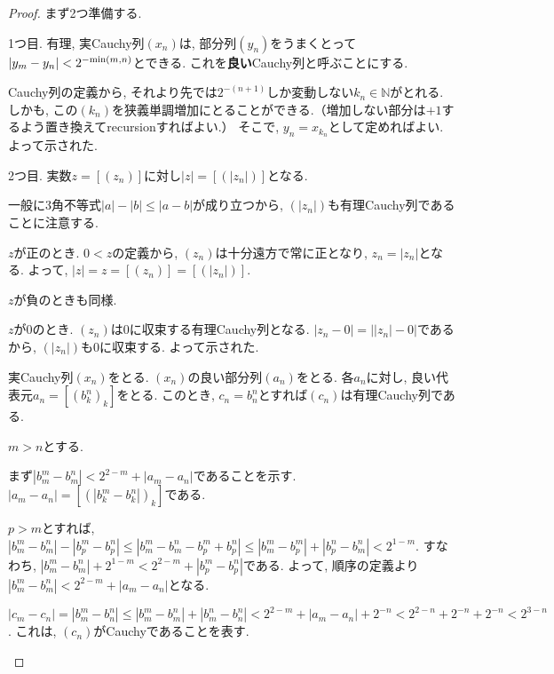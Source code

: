 \documentclass[a4paper, twoside]{bxjsarticle}
\newcommand{\nat}{\mathbb{N}}
\newcommand{\abs}[1]{\left\lvert#1\right\rvert}
\theoremstyle{definition}
\begin{document}
        \begin{proof}
            まず2つ準備する.
            
            1つ目. 有理, 実Cauchy列$(x_n)$は, 部分列$(y_n)$をうまくとって$\abs{y_m-y_n}<2^{-{\rm min}(m, n)}$とできる. これを\textbf{良い}Cauchy列と呼ぶことにする.
            \begin{framed}
                Cauchy列の定義から, それより先では$2^{-(n+1)}$しか変動しない$k_n\in\nat$がとれる. しかも, この$(k_n)$を狭義単調増加にとることができる.（増加しない部分は$+1$するよう置き換えてrecursionすればよい.） そこで, $y_n = x_{k_n}$として定めればよい. よって示された.
            \end{framed}
            
            2つ目. 実数$z=[(z_n)]$に対し$\abs{z}=[(\abs{z_n})]$となる.
            \begin{framed}
                一般に3角不等式$\abs{a}-\abs{b}\leq\abs{a-b}$が成り立つから, $(\abs{z_n})$も有理Cauchy列であることに注意する.
                
                $z$が正のとき. $0<z$の定義から, $(z_n)$は十分遠方で常に正となり, $z_n=\abs{z_n}$となる. よって, $\abs{z}=z=[(z_n)]=[(\abs{z_n})]$.
                
                $z$が負のときも同様.
                
                $z$が0のとき. $(z_n)$は0に収束する有理Cauchy列となる. $\abs{z_n-0}=\abs{\abs{z_n}-0}$であるから, $(\abs{z_n})$も0に収束する. よって示された.
            \end{framed}
            
            実Cauchy列$(x_n)$をとる. $(x_n)$の良い部分列$(a_n)$をとる. 各$a_n$に対し, 良い代表元$a_n=[(b_k^n)_k]$をとる. このとき, $c_n = b_n^n$とすれば$(c_n)$は有理Cauchy列である.
            \begin{framed}
                $m>n$とする. 
                
                まず$\abs{b_m^m-b_m^n}<2^{2-m}+\abs{a_m-a_n}$であることを示す. $\abs{a_m-a_n}=[(\abs{b_k^m-b_k^n})_k]$である.
                
                $p>m$とすれば, $\abs{b_m^m-b_m^n}-\abs{b_p^m-b_p^n}\leq\abs{b_m^m-b_m^n-b_p^m+b_p^n}\leq\abs{b_m^m-b_p^m}+\abs{b_p^n-b_m^n}<2^{1-m}$. すなわち, $\abs{b_m^m-b_m^n}+2^{1-m}<2^{2-m}+\abs{b_p^m-b_p^n}$である. よって, 順序の定義より $\abs{b_m^m-b_m^n}<2^{2-m}+\abs{a_m-a_n}$となる.
                
                $\abs{c_m-c_n} = \abs{b_m^m-b_n^n} \leq \abs{b_m^m-b_m^n}+\abs{b_m^n-b_n^n}< 2^{2-m}+\abs{a_m-a_n}+2^{-n}< 2^{2-n}+2^{-n}+2^{-n}<2^{3-n}$. これは, $(c_n)$がCauchyであることを表す.
            \end{framed}
            

\end{proof}
\end{document}
